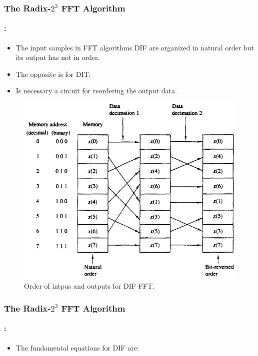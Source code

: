 \begin{frame}
  	\frametitle{\textbf{The Radix-$2^3$ FFT  Algorithm}}
	\framesubtitle{\secname : \subsecname}
	\begin{block}{\centering}
	\begin{itemize}
		\item The input samples in FFT algorithms DIF are 	organized in natural order but its output has not in order.
		\item  The opposite is for DIT. 
		\item Is necessary a circuit for reordering the output data.		 
	\end{itemize}
\end{block}
    \begin{figure}[h!] \centering
    \includegraphics[width=0.4\paperwidth]{./image/dif_order.png}
    \caption{\footnotesize Order of intpus and outputs for DIF FFT.} %
    \end{figure}
\end{frame}

\begin{frame}
  	\frametitle{\textbf{The Radix-$2^3$ FFT  Algorithm}}
	\framesubtitle{\secname : \subsecname}
	\begin{block}{\centering}
	\begin{itemize}
		\item The fundamental equations for DIF are:
		 
	\end{itemize}			
		
		
	\end{block}
    
    
\end{frame}

